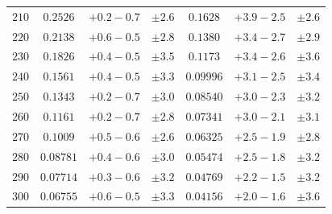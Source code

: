 \begin{table}
\begin{center}
\begin{tabular}{ccccccc}
$ 210 $ & $   0.2526 $ & $   +0.2   -\!0.7  $ & 
$ \pm 2.6 $
 & $   0.1628 $ & $  +3.9   -\!2.5  $ &
$ \pm 2.6 $ \\[.2em]

$ 220 $ & $   0.2138 $ & $   +0.6   -\!0.5  $ & 
$ \pm 2.8 $
 & $   0.1380 $ & $   +3.4   -\!2.7  $ &
$ \pm 2.9 $ \\[.2em]

$ 230 $ & $   0.1826 $ & $   +0.4   -\!0.5  $ & 
$ \pm 3.5 $
 & $   0.1173 $ & $   +3.4   -\!2.6  $ &
$ \pm 3.6 $ \\[.2em]

$ 240 $ & $   0.1561 $ & $   +0.4   -\!0.5  $ & 
$ \pm 3.3 $
 & $  0.09996 $ & $   +3.1   -\!2.5  $ &
$ \pm 3.4 $ \\[.2em]

$ 250 $ & $   0.1343 $ & $   +0.2   -\!0.7  $ & 
$ \pm 3.0 $
 & $  0.08540 $ & $  +3.0   -\!2.3  $ &
$ \pm 3.2 $ \\[.2em]

$ 260 $ & $   0.1161 $ & $   +0.2   -\!0.7  $ & 
$ \pm 2.8 $
 & $  0.07341 $ & $  +3.0   -\!2.1  $ &
$ \pm 3.1 $ \\[.2em]

$ 270 $ & $   0.1009 $ & $   +0.5   -\!0.6  $ & 
$ \pm 2.6 $
 & $  0.06325 $ & $  +2.5   -\!1.9  $ &
$ \pm 2.8 $ \\[.2em]

$ 280 $ & $  0.08781 $ & $   +0.4   -\!0.6  $ & 
$ \pm 3.0 $
 & $  0.05474 $ & $  +2.5   -\!1.8  $ &
$ \pm 3.2 $ \\[.2em]

$ 290 $ & $  0.07714 $ & $   +0.3   -\!0.6  $ & 
$ \pm 3.2 $
 & $  0.04769 $ & $  +2.2   -\!1.5  $ &
$ \pm 3.2 $ \\[.2em]

$ 300 $ & $  0.06755 $ & $   +0.6   -\!0.5  $ & 
$ \pm 3.3 $
 & $  0.04156 $ & $   +2.0   -\!1.6  $ &
$ \pm 3.6 $ \\[.2em]

   \hline
   \end{tabular}
   \end{center}
\end{table}

\clearpage




